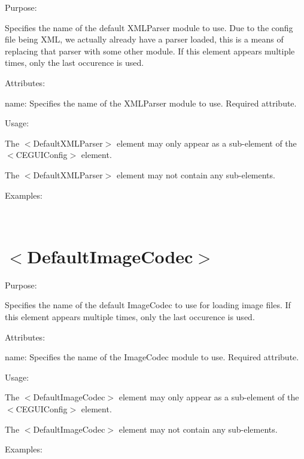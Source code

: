 \begin{DoxyItemize}
\item Purpose\+:
\begin{DoxyItemize}
\item Specifies the name of the default X\+M\+L\+Parser module to use. Due to the config file being X\+ML, we actually already have a parser loaded, this is a means of replacing that parser with some other module. If this element appears multiple times, only the last occurence is used.
\end{DoxyItemize}
\item Attributes\+:
\begin{DoxyItemize}
\item {\ttfamily name\+:} Specifies the name of the X\+M\+L\+Parser module to use. Required attribute.
\end{DoxyItemize}
\item Usage\+:
\begin{DoxyItemize}
\item The $<$Default\+X\+M\+L\+Parser$>$ element may only appear as a sub-\/element of the $<$C\+E\+G\+U\+I\+Config$>$ element.
\item The $<$Default\+X\+M\+L\+Parser$>$ element may not contain any sub-\/elements.
\end{DoxyItemize}
\item Examples\+:
\end{DoxyItemize}

~\newline
 \hypertarget{xml_config_xml_config_imagecodec}{}\section{$<$\+Default\+Image\+Codec$>$}\label{xml_config_xml_config_imagecodec}

\begin{DoxyItemize}
\item Purpose\+:
\begin{DoxyItemize}
\item Specifies the name of the default Image\+Codec to use for loading image files. If this element appears multiple times, only the last occurence is used.
\end{DoxyItemize}
\item Attributes\+:
\begin{DoxyItemize}
\item {\ttfamily name\+:} Specifies the name of the Image\+Codec module to use. Required attribute.
\end{DoxyItemize}
\item Usage\+:
\begin{DoxyItemize}
\item The $<$Default\+Image\+Codec$>$ element may only appear as a sub-\/element of the $<$C\+E\+G\+U\+I\+Config$>$ element.
\item The $<$Default\+Image\+Codec$>$ element may not contain any sub-\/elements.
\end{DoxyItemize}
\item Examples\+:
\end{DoxyItemize}

